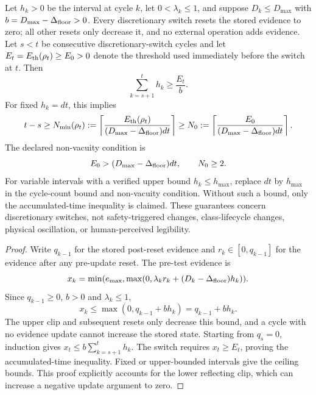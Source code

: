 \begin{proposition} \label{prop:p2}
Let $h_k>0$ be the interval at cycle $k$, let $0<\lambda_k\le1$, and suppose $D_k\le D_{\max}$ with $b=D_{\max}-\Delta_{\text{floor}}>0$. Every discretionary switch resets the stored evidence to zero; all other resets only decrease it, and no external operation adds evidence. Let $s<t$ be consecutive discretionary-switch cycles and let $E_t=E_{\text{th}}(\rho_t)\ge E_0>0$ denote the threshold used immediately before the switch at $t$. Then
\begin{equation}
\sum_{k=s+1}^{t} h_k \ge \frac{E_t}{b}.
\label{eq:p2variable}
\end{equation}
For fixed $h_k=dt$, this implies
\begin{equation}
t-s\ge N_{\min}(\rho_t):=\left\lceil\frac{E_{\text{th}}(\rho_t)}{(D_{\max}-\Delta_{\text{floor}})dt}\right\rceil
\ge N_0:=\left\lceil\frac{E_0}{(D_{\max}-\Delta_{\text{floor}})dt}\right\rceil.
\label{eq:nmin}
\end{equation}
The declared non-vacuity condition is
\begin{equation}
E_0>(D_{\max}-\Delta_{\text{floor}})dt,\qquad N_0\ge2.
\label{eq:p2nonvac}
\end{equation}
For variable intervals with a verified upper bound $h_k\le h_{\max}$, replace $dt$ by $h_{\max}$ in the cycle-count bound and non-vacuity condition. Without such a bound, only the accumulated-time inequality is claimed. These guarantees concern discretionary switches, not safety-triggered changes, class-lifecycle changes, physical oscillation, or human-perceived legibility.
\end{proposition}

\begin{proof}
Write $q_{k-1}$ for the stored post-reset evidence and $r_k\in[0,q_{k-1}]$ for the evidence after any pre-update reset. The pre-test evidence is
\[
x_k=\min(e_{\max},\max(0,\lambda_k r_k+(D_k-\Delta_{\text{floor}})h_k)).
\]
Since $q_{k-1}\ge0$, $b>0$ and $\lambda_k\le1$,
\[
x_k\le\max(0,q_{k-1}+bh_k)=q_{k-1}+bh_k.
\]
The upper clip and subsequent resets only decrease this bound, and a cycle with no evidence update cannot increase the stored state. Starting from $q_s=0$, induction gives $x_t\le b\sum_{k=s+1}^t h_k$. The switch requires $x_t\ge E_t$, proving the accumulated-time inequality. Fixed or upper-bounded intervals give the ceiling bounds. This proof explicitly accounts for the lower reflecting clip, which can increase a negative update argument to zero.
\end{proof}


